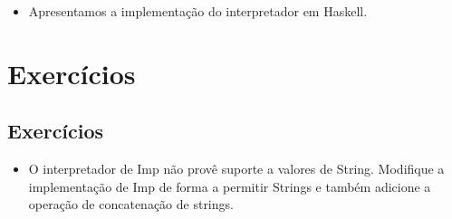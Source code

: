 \documentclass[11pt]{article}
\begin{document}
\begin{itemize}
\item Apresentamos a implementação do interpretador em Haskell.
\end{itemize}
\section*{Exercícios}
\label{sec:org97cf130}

\subsection*{Exercícios}
\label{sec:org0d195ce}

\begin{itemize}
\item O interpretador de Imp não provê suporte a valores de String.
Modifique a implementação de Imp de forma a permitir Strings e
também adicione a operação de concatenação de strings.
\end{itemize}
\end{document}
